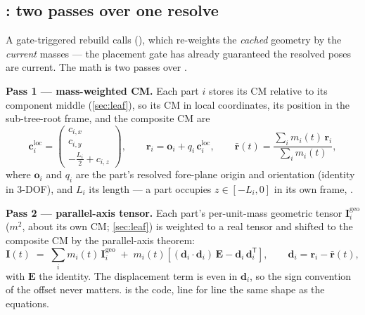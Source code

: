 \subsection[computeCompositeAt: two passes over one resolve]{: two passes over one resolve}\label{sec:caching-composite}

A gate-triggered rebuild calls 
(), which re-weights the \emph{cached} geometry by the
\emph{current} masses --- the placement gate has already guaranteed the resolved poses are
current. The math is two passes over .

\textbf{Pass 1 --- mass-weighted CM.} Each part $i$ stores its CM relative to its component
middle (\cref{sec:leaf}), so its CM in local coordinates, its position in the sub-tree-root frame,
and the composite CM are
\begin{equation}
\mathbf{c}^{\mathrm{loc}}_i =
\begin{pmatrix} c_{i,x}\\[2pt] c_{i,y}\\[2pt] -\tfrac{L_i}{2} + c_{i,z} \end{pmatrix},
\qquad
\mathbf{r}_i = \mathbf{o}_i + q_i\,\mathbf{c}^{\mathrm{loc}}_i,
\qquad
\bar{\mathbf{r}}(t) = \frac{\sum_i m_i(t)\,\mathbf{r}_i}{\sum_i m_i(t)},
\label{eq:caching-cm}
\end{equation}
where $\mathbf{o}_i$ and $q_i$ are the part's resolved fore-plane origin and orientation
(identity in 3-DOF), and $L_i$ its length --- a part occupies $z \in [-L_i, 0]$ in its own frame,
\zfwd.

\textbf{Pass 2 --- parallel-axis tensor.} Each part's per-unit-mass geometric tensor
$\mathbf{I}^{\mathrm{geo}}_i$ ($\unit{m^2}$, about its own CM; \cref{sec:leaf}) is weighted to a
real tensor and shifted to the composite CM by the parallel-axis theorem:
\begin{equation}
\mathbf{I}(t) \;=\; \sum_i m_i(t)\,\mathbf{I}^{\mathrm{geo}}_i
\;+\; m_i(t)\left[(\mathbf{d}_i\!\cdot\!\mathbf{d}_i)\,\mathbf{E}
- \mathbf{d}_i\,\mathbf{d}_i^{\mathsf{T}}\right],
\qquad
\mathbf{d}_i = \mathbf{r}_i - \bar{\mathbf{r}}(t),
\label{eq:caching-pat}
\end{equation}
with $\mathbf{E}$ the identity. The displacement term is even in $\mathbf{d}_i$, so the sign
convention of the offset never matters.  is the code, line for line the
same shape as the equations.

